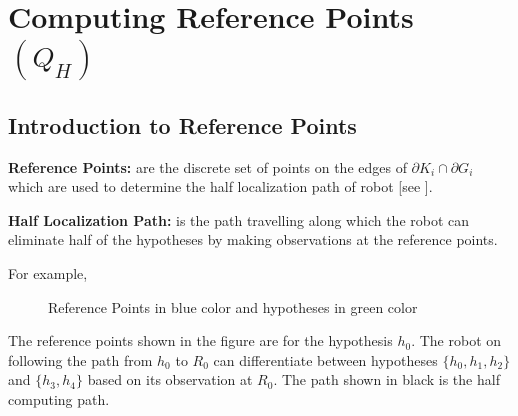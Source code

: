 \def\baselinestretch{1}
\chapter{Computing Reference Points $(Q_{H})$}
\section{Introduction to Reference Points}
\begin{definition}
 {\bf Reference Points:} are the discrete set of points on the edges of $\partial K_{i} \cap \partial G_{i}$  which are used to determine the
  half localization path of robot [see \cite{key5}].   
\end{definition}

\begin{definition}
 {\bf Half Localization Path:} is the path travelling along which the robot can eliminate half of the hypotheses by making
 observations at the reference points.
\end{definition}

For example,

\begin{figure}[h]
\begin{center}
\caption{\label{fig:Reference Points}Reference Points in blue color and hypotheses in green color}
\end{center}
\end{figure}

The reference points shown in the figure are for the hypothesis $h_0$. The robot on following the path from $h_0$ to $R_0$ 
can differentiate between hypotheses $\{h_0,h_1,h_2\}$ and $\{h_3, h_4\}$ based on its observation at $R_0$. The path shown in black is the half computing path.

